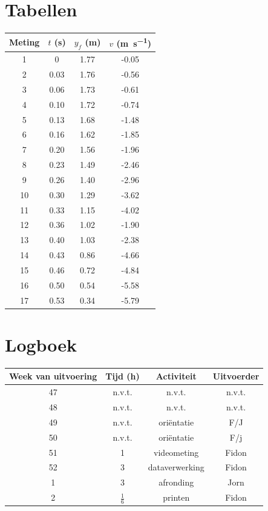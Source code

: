 \documentclass{scrartcl}
\begin{document}
\section{Tabellen}
\begin{center}
\begin{tabular}{*{4}{S[table-format=1.2]}}
\toprule
{Meting} & {$t$ (\si{\second})} & {$y_f$ (\si{\meter})} & {$v$ (\si{\meter\per\second})}\\
& 0	 & 1.77&-0.05 \\
2& 0.03 & 1.76&-0.56 \\
3 &0.06 & 1.73&-0.61 \\
4 &0.10 & 1.72&-0.74 \\
5 &0.13 & 1.68&-1.48 \\
6 &0.16 & 1.62&-1.85 \\
7 &0.20 & 1.56&-1.96 \\
8 &0.23 & 1.49&-2.46 \\
9 &0.26 & 1.40&-2.96 \\
10 &0.30 & 1.29&-3.62 \\
11 &0.33 & 1.15&-4.02 \\
12 &0.36 & 1.02&-1.90 \\
13 &0.40 & 1.03&-2.38 \\
14 &0.43 & 0.86&-4.66 \\
15& 0.46 & 0.72&-4.84 \\
16 &0.50 & 0.54&-5.58 \\
17& 0.53 & 0.34&-5.79 \\
\bottomrule
\end{tabular}
\label{tab:Kwadraat}
\end{center}
%
\newpage
\section{Logboek}
\begin{center}
\begin{tabular}[center]{*4c}
\toprule
Week van uitvoering & Tijd (\si{\hour})& Activiteit & Uitvoerder\\
\midrule
47 & n.v.t. & n.v.t. & n.v.t.\\
48 &n.v.t.  & n.v.t. & n.v.t.\\
49 & n.v.t. &ori\"{e}ntatie& F/J\\
50 &  n.v.t.&  ori\"{e}ntatie&F/j \\
51 &  1     &videometing  &Fidon \\
52 &  3     &dataverwerking  &Fidon \\
1  &  3     &afronding  &Jorn \\
2 &  $\frac{1}{6}$&printen  &Fidon \\
\bottomrule
\end{tabular}
\end{center}
\end{document}
